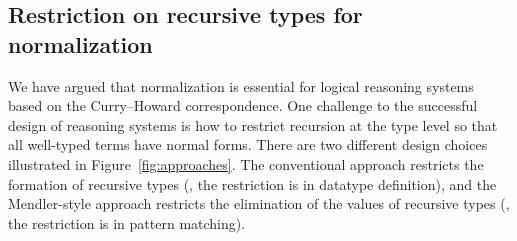 \subsection{Restriction on recursive types for normalization}
\label{sec:intro:concpets:recursive}
We have argued that normalization is essential for logical reasoning systems
based on the Curry--Howard correspondence. One challenge to the successful
design of reasoning systems is how to restrict recursion at the type level
so that all well-typed terms have normal forms. There are two different
design choices illustrated in Figure~\ref{fig:approaches}. 
The conventional approach restricts the formation of recursive types
(\ie, the restriction is in datatype definition), and
the Mendler-style approach restricts the elimination of the values of
recursive types (\ie, the restriction is in pattern matching).

